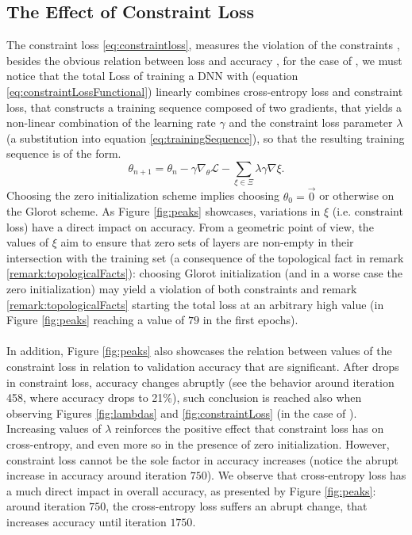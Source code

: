 \subsection{The Effect of Constraint Loss}\label{subsec:constraintLoss}
The constraint loss \ref{eq:constraintloss}, measures the  violation of the constraints \cite{florenzano2001ConvexAnalysis,Burges1998TutorialOnSVMForPatternRecognition}, besides the obvious relation between loss and accuracy \cite{LeCun06atutorial,lecun2015DeepLearningBig}, for the case of \SCReLU, we must notice that the total Loss of training a DNN with \SCReLU (equation \ref{eq:constraintLossFunctional}) linearly combines cross-entropy loss and constraint loss, that constructs a training sequence composed of two gradients, that yields a non-linear combination of the learning rate $\gamma$ and the constraint loss parameter $\lambda$ (a substitution into equation \ref{eq:trainingSequence}), so that the resulting training sequence is of the form.
\begin{equation}\label{eq:resultingConstraintLoss}
\theta_{n+1} = \theta_n - \gamma\nabla_{\theta}\mathcal{L}-\sum_{\xi\in\Xi}\lambda\gamma\nabla\xi.
\end{equation}
Choosing the zero initialization scheme implies choosing $\theta_0=\vec{0}$ or otherwise on the Glorot scheme. As Figure \ref{fig:peaks} showcases, variations in $\xi$ (i.e. constraint loss) have a direct impact on accuracy.  From a geometric point of view, the values of $\xi$ aim to ensure that zero sets of layers are non-empty in their intersection with the training set (a consequence of the topological fact in remark \ref{remark:topologicalFacts}): choosing Glorot initialization (and in a worse case the zero initialization) may yield a violation of both constraints and remark \ref{remark:topologicalFacts} starting the total loss at an arbitrary high value (in Figure \ref{fig:peaks} reaching a value of $79$ in the first epochs).     
\\\\
In addition, Figure \ref{fig:peaks} also showcases the relation between values of the constraint loss in relation to validation accuracy that are significant. After drops in constraint loss, accuracy changes abruptly (see the behavior around iteration 458, where accuracy drops to 21\%), such conclusion is reached also when observing Figures \ref{fig:lambdas} and \ref{fig:constraintLoss} (in the case of \cifar). Increasing values of $\lambda$ reinforces the positive effect that constraint loss has on cross-entropy, and even more so in the presence of zero initialization. However, constraint loss cannot be the sole factor in accuracy increases (notice the abrupt increase in accuracy around iteration $750$). We observe that cross-entropy loss has a much direct impact in overall accuracy, as presented by Figure \ref{fig:peaks}: around iteration $750$, the cross-entropy loss suffers an abrupt change, that increases accuracy until iteration $1750$.   
